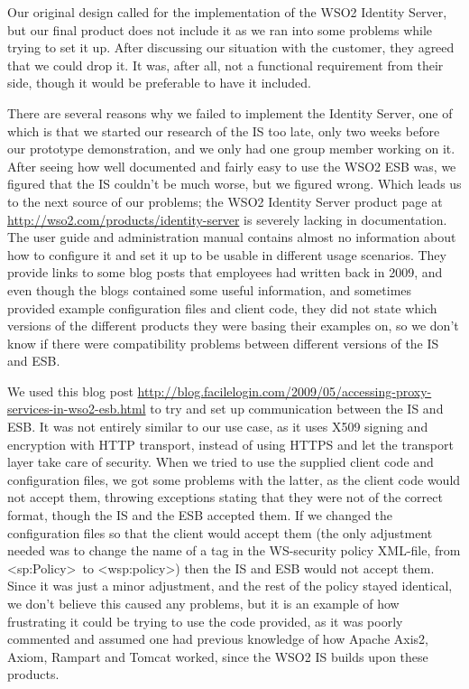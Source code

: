     Our original design called for the implementation of the WSO2 Identity Server, but our final product does not include it as we ran into some problems while trying to set it up. After discussing our situation with the customer, they agreed that we could drop it. It was, after all, not a functional requirement from their side, though it would be preferable to have it included.

    There are several reasons why we failed to implement the Identity Server, one of which is that we started our research of the IS too late, only two weeks before our prototype demonstration, and we only had one group member working on it. After seeing how well documented and fairly easy to use the WSO2 ESB was, we figured that the IS couldn't be much worse, but we figured wrong. Which leads us to the next source of our problems; the WSO2 Identity Server product page at \url{http://wso2.com/products/identity-server} is severely lacking in documentation. The user guide and administration manual contains almost no information about how to configure it and set it up to be usable in different usage scenarios. They provide links to some blog posts that employees had written back in 2009, and even though the blogs contained some useful information, and sometimes provided example configuration files and client code, they did not state which versions of the different products they were basing their examples on, so 
we don't know if there were compatibility problems between different versions of the IS and ESB.

    We used this blog post \url{http://blog.facilelogin.com/2009/05/accessing-proxy-services-in-wso2-esb.html} to try and set up communication between the IS and ESB. It was not entirely similar to our use case, as it uses X509 signing and encryption with HTTP transport, instead of using HTTPS and let the transport layer take care of security. When we tried to use the supplied client code and configuration files, we got some problems with the latter, as the client code would not accept them, throwing exceptions stating that they were not of the correct format, though the IS and the ESB accepted them. If we changed the configuration files so that the client would accept them (the only adjustment needed was to change the name of a tag in the WS-security policy XML-file, from \textless sp:Policy\textgreater\ to \textless wsp:policy\textgreater) then the IS and ESB would not accept them. Since it was just a minor adjustment, and the rest of the policy stayed identical, we don't believe this caused any problems, 
but it is an example of how frustrating it could be trying to use the code provided, as it was poorly commented and assumed one had previous knowledge of how Apache Axis2, Axiom, Rampart and Tomcat worked, since the WSO2 IS builds upon these products.

